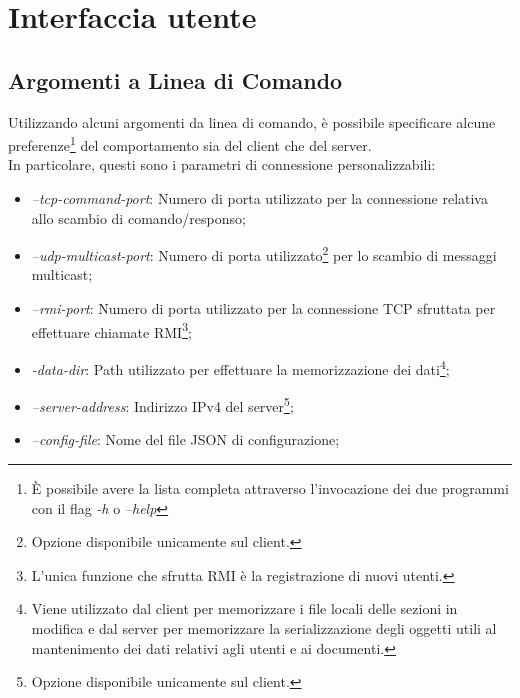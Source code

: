 \section{Interfaccia utente}
\subsection{Argomenti a Linea di Comando}
Utilizzando alcuni argomenti da linea di comando, è possibile specificare alcune preferenze\footnote{È possibile avere la lista completa attraverso l'invocazione dei due programmi con il flag \textit{-h} o \textit{--help} } del comportamento sia del client che del server. \\
In particolare, questi sono i parametri di connessione personalizzabili:

\begin{itemize}
	\item\textit{--tcp-command-port}: Numero di porta utilizzato per la connessione relativa allo scambio di comando/responso;
	\item\textit{--udp-multicast-port}: Numero di porta utilizzato\footnote{Opzione disponibile unicamente sul client.} per lo scambio di messaggi multicast;
	\item\textit{--rmi-port}: Numero di porta utilizzato per la connessione TCP sfruttata per effettuare chiamate RMI\footnote{L'unica funzione che sfrutta RMI è la registrazione di nuovi utenti.};
	\item\textit{-data-dir}: Path utilizzato per effettuare la memorizzazione dei dati\footnote{Viene utilizzato dal client per memorizzare i file locali delle sezioni in modifica e dal server per memorizzare la serializzazione degli oggetti utili al mantenimento dei dati relativi agli utenti e ai documenti.};
	\item\textit{--server-address}: Indirizzo IPv4 del server\footnote{Opzione disponibile unicamente sul client.};
	\item\textit{--config-file}: Nome del file JSON di configurazione;
\end{itemize}
